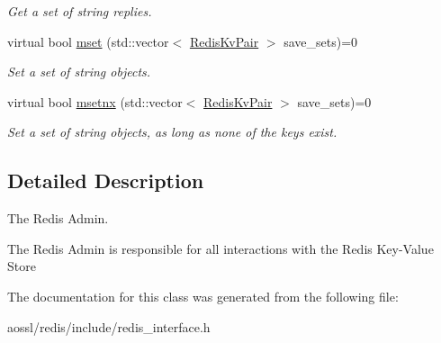 \begin{DoxyCompactItemize}
\begin{DoxyCompactList}\small\item\em Get a set of string replies. \end{DoxyCompactList}\item 
virtual bool \hyperlink{classRedisInterface_ad396ae3e13286451ff6f494f462cb349}{mset} (std\+::vector$<$ \hyperlink{structRedisKvPair}{Redis\+Kv\+Pair} $>$ save\+\_\+sets)=0\hypertarget{classRedisInterface_ad396ae3e13286451ff6f494f462cb349}{}\label{classRedisInterface_ad396ae3e13286451ff6f494f462cb349}

\begin{DoxyCompactList}\small\item\em Set a set of string objects. \end{DoxyCompactList}\item 
virtual bool \hyperlink{classRedisInterface_ae3281e8788a6f972b7cba305794e53a0}{msetnx} (std\+::vector$<$ \hyperlink{structRedisKvPair}{Redis\+Kv\+Pair} $>$ save\+\_\+sets)=0\hypertarget{classRedisInterface_ae3281e8788a6f972b7cba305794e53a0}{}\label{classRedisInterface_ae3281e8788a6f972b7cba305794e53a0}

\begin{DoxyCompactList}\small\item\em Set a set of string objects, as long as none of the keys exist. \end{DoxyCompactList}\end{DoxyCompactItemize}


\subsection{Detailed Description}
The Redis Admin. 

The Redis Admin is responsible for all interactions with the Redis Key-\/\+Value Store 

The documentation for this class was generated from the following file\+:\begin{DoxyCompactItemize}
\item 
aossl/redis/include/redis\+\_\+interface.\+h\end{DoxyCompactItemize}
